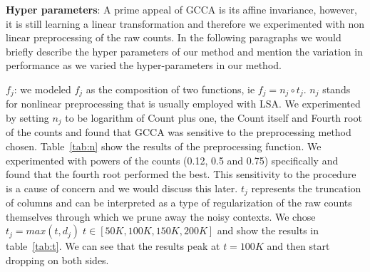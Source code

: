 \documentclass[11pt]{article}
\begin{document}
\textbf{Hyper parameters}: A prime
appeal of GCCA is its affine invariance, however, it is still learning a linear
transformation and therefore we experimented with non linear
preprocessing of the raw counts. In the following paragraphs
we would briefly describe the hyper parameters of our method and
mention the variation in performance as we varied the 
hyper-parameters in our method.

$f_j$: we modeled $f_j$ as the composition of two
  functions, ie $f_j = n_j \circ t_j$.
  $n_j$ stands for nonlinear preprocessing that is usually
  employed with LSA. We experimented by setting $n_j$ to be
  logarithm of Count plus one, the Count itself and Fourth root of the counts and found
  that GCCA was sensitive to the preprocessing method chosen. Table~\ref{tab:n} show
  the results of the preprocessing function. We experimented with
  powers of the counts (0.12, 0.5 and 0.75) specifically and found
  that the fourth root performed the best. This sensitivity to
  the procedure is a cause of concern and we would discuss this
  later.
  $t_j$ represents the truncation of columns and can be interpreted as
  a type of regularization of the raw counts themselves through which
  we prune away the noisy contexts. We chose $t_j =
  max(t, d_j) \; t \in [50K, 100K, 150K, 200K]$ and show the results
  in table~\ref{tab:t}. We can see that the results peak at $t=100K$
  and then start dropping on both sides.
\end{document}
